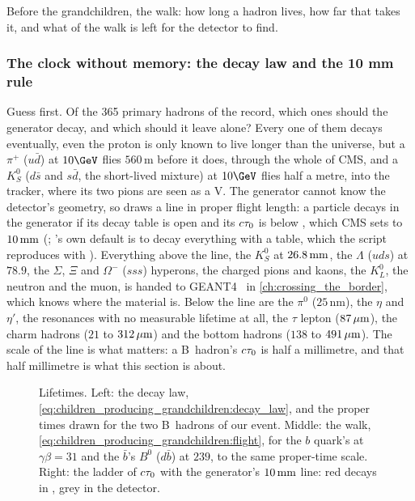 Before the grandchildren, the walk: how long a hadron lives, how far that
takes it, and what of the walk is left for the detector to find.

\subsubsection{The clock without memory: the decay law and the 10 mm rule}
\label{sec:children_producing_grandchildren:lifetime}

Guess first. Of the 365 primary hadrons of the record, which ones should
the generator decay, and which should it leave alone? Every one of them
decays eventually, even the proton is only known to live longer than the
universe, but a $\pi^+$ ($u\bar d$) at $10\GeV$ flies $560\,\mathrm{m}$
before it does, through the whole of CMS, and a $K_S^0$ ($d\bar s$ and
$s\bar d$, the short-lived mixture) at $10\GeV$ flies half a metre, into
the tracker, where its two pions are seen as a V. The generator cannot
know the detector's geometry, so \PYTHIA draws a line in proper flight
length: a particle decays in the generator if its decay table is open and
its $c\tau_0$ is below , which CMS sets to
$10\,\mathrm{mm}$ (; \PYTHIA's own default is to decay
everything with a table, which the script reproduces with
). Everything above the line, the $K_S^0$ at
$26.8\,\mathrm{mm}$, the $\Lambda$ ($uds$) at $78.9$, the $\Sigma$, $\Xi$ and
$\Omega^-$ ($sss$) hyperons, the charged pions and kaons, the $K_L^0$, the
neutron and the muon, is handed to GEANT4~\cite{GEANT4:2002zbu} in
\cref{ch:crossing_the_border}, which knows where the material is. Below
the line are the $\pi^0$ ($25\,\mathrm{nm}$), the $\eta$ and $\eta'$, the
resonances with no measurable lifetime at all, the $\tau$ lepton
($87\,\mu\mathrm{m}$), the charm hadrons ($21$ to $312\,\mu\mathrm{m}$) and the bottom hadrons
($138$ to $491\,\mu\mathrm{m}$). The scale of the line is what matters: a B~hadron's
$c\tau_0$ is half a millimetre, and that half millimetre is what this
section is about.

\begin{figure}[htbp]\centering
\resizebox{\textwidth}{!}{}
\caption[The decay law, the walk and the ladder of lifetimes]{Lifetimes.
Left: the decay law, \cref{eq:children_producing_grandchildren:decay_law},
and the proper times drawn for the two B~hadrons of our event. Middle: the
walk, \cref{eq:children_producing_grandchildren:flight}, for the $b$
quark's \Bbar at $\gamma\beta=31$ and the $\bar b$'s $B^0$ ($d\bar b$) at
$239$, to the same proper-time scale. Right: the ladder of $c\tau_0$ with
the generator's $10\,\mathrm{mm}$ line: red decays in \PYTHIA, grey in the detector.}
\label{fig:children_producing_grandchildren:clock_sketch}
\end{figure}

